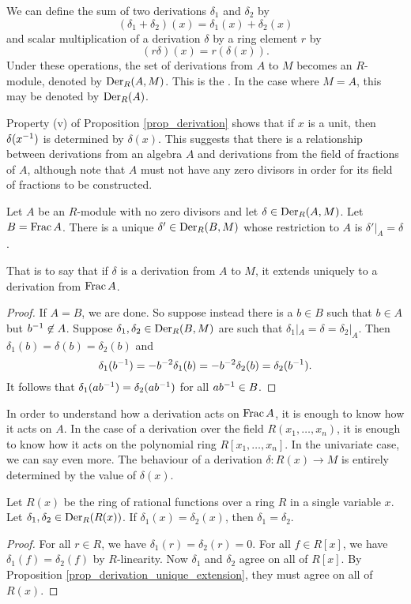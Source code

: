 We can define the sum of two derivations $\delta_1$ and $\delta_2$ by
  \[ (\delta_1 + \delta_2)(x) = \delta_1(x) + \delta_2(x) \]
and scalar multiplication of a derivation $\delta$ by a ring element $r$ by
  \[ (r\delta)(x) = r (\delta(x)). \]
Under these operations, the set of derivations from $A$ to $M$ becomes an $R$-module,
denoted by $\operatorname{Der}_R(A,M)$.
This is the .
In the case where $M = A$, this may be denoted by $\operatorname{Der}_R(A)$.

Property (v) of Proposition \ref{prop_derivation} shows that if $x$ is a unit,
then $\delta(x^{-1})$ is determined by $\delta(x)$.
This suggests that there is a relationship between derivations from an algebra $A$
and derivations from the field of fractions of $A$,
although note that $A$ must not have any zero divisors in order for its field of fractions to be constructed.

\begin{proposition}
  \label{prop_derivation_unique_extension}
  Let $A$ be an $R$-module with no zero divisors and let $\delta \in \operatorname{Der}_R(A,M)$.
  Let $B = \operatorname{Frac} A$.
  There is a unique $\delta' \in \operatorname{Der}_R(B, M)$ whose restriction to $A$ is $\delta'|_A = \delta$.
\end{proposition}
That is to say that if $\delta$ is a derivation from $A$ to $M$,
it extends uniquely to a derivation from $\operatorname{Frac} A$.
\begin{proof}
  If $A = B$, we are done.
  So suppose instead there is a $b \in B$ such that $b\in A$ but $b^{-1} \not \in A$.
  Suppose $\delta_1, \delta_2 \in \operatorname{Der}_R(B, M)$ are such that $\delta_1|_{A} = \delta = \delta_2|_{A}$.
  Then $\delta_1(b) = \delta(b) = \delta_2(b)$ and
    \[ \delta_1(b^{-1}) = -b^{-2}\delta_1(b) = -b^{-2}\delta_2(b) = \delta_2(b^{-1}). \]
  It follows that $\delta_1(ab^{-1}) = \delta_2(ab^{-1})$ for all $ab^{-1} \in B$.
\end{proof}

In order to understand how a derivation acts on $\operatorname{Frac} A$, it is enough to know how it acts on $A$.
In the case of a derivation over the field $R(x_1, \ldots, x_n)$,
it is enough to know how it acts on the polynomial ring $R[x_1, \ldots, x_n]$.
In the univariate case, we can say even more.
The behaviour of a derivation $\delta: R(x) \to M$ is entirely determined by the value of $\delta(x)$.

\begin{proposition}
  \label{prop_derivation_unique_x}
  Let $R(x)$ be the ring of rational functions over a ring $R$ in a single variable $x$.
  Let $\delta_1, \delta_2 \in \operatorname{Der}_R(R(x))$.
  If $\delta_1(x) = \delta_2(x)$, then $\delta_1 = \delta_2$.
\end{proposition}
\begin{proof}
  For all $r \in R$, we have $\delta_1(r) = \delta_2(r) = 0$.
  For all $f \in R[x]$, we have $\delta_1(f) = \delta_2(f)$ by $R$-linearity.
  Now $\delta_1$ and $\delta_2$ agree on all of $R[x]$.
  By Proposition \ref{prop_derivation_unique_extension}, they must agree on all of $R(x)$.
\end{proof}

